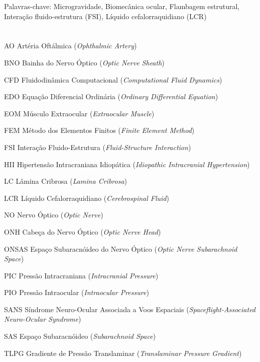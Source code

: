 \documentclass[article, hidelinks,oneside,12pt]{abntex2}
\begin{document}
Palavras-chave: Microgravidade, Biomecânica ocular, Flambagem estrutural, Interação fluido-estrutura (FSI), Líquido cefalorraquidiano (LCR)



\section*{}

\begin{siglas}
  \item[AO] Artéria Oftálmica (\textit{Ophthalmic Artery})
  \item[BNO] Bainha do Nervo Óptico (\textit{Optic Nerve Sheath})
  \item[CFD] Fluidodinâmica Computacional (\textit{Computational Fluid Dynamics})
  \item[EDO] Equação Diferencial Ordinária (\textit{Ordinary Differential Equation})
  \item[EOM] Músculo Extraocular (\textit{Extraocular Muscle})
  \item[FEM] Método dos Elementos Finitos (\textit{Finite Element Method})
  \item[FSI] Interação Fluido-Estrutura (\textit{Fluid-Structure Interaction})
  \item[HII] Hipertensão Intracraniana Idiopática (\textit{Idiopathic Intracranial Hypertension})
  \item[LC] Lâmina Cribrosa (\textit{Lamina Cribrosa})
  \item[LCR] Líquido Cefalorraquidiano (\textit{Cerebrospinal Fluid})
  \item[NO] Nervo Óptico (\textit{Optic Nerve})
  \item[ONH] Cabeça do Nervo Óptico (\textit{Optic Nerve Head})
  \item[ONSAS] Espaço Subaracnóideo do Nervo Óptico (\textit{Optic Nerve Subarachnoid Space})
  \item[PIC] Pressão Intracraniana (\textit{Intracranial Pressure})
  \item[PIO] Pressão Intraocular (\textit{Intraocular Pressure})
  \item[SANS] Síndrome Neuro-Ocular Associada a Voos Espaciais (\textit{Spaceflight-Associated Neuro-Ocular Syndrome})
  \item[SAS] Espaço Subaracnóideo (\textit{Subarachnoid Space})
  \item[TLPG] Gradiente de Pressão Translaminar (\textit{Translaminar Pressure Gradient})
\end{siglas}
\end{document}
